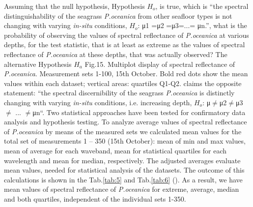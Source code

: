 \documentclass[11pt]{article}
\begin{document}
Assuming that the null hypothesis, Hypothesis $H_o$, is true, which is “the spectral distinguishability of
the seagrass \textit{P.oceanica} from other seafloor types is not changing with varying \textit{in-situ} conditions,
$H_o$: μ1 =μ2 =μ3=...= μn.”, what is the probability of observing the values of spectral reflectance of
\textit{P.oceanica} at various depths, for the test statistic, that is at least as extreme as the values of spectral
reflectance of \textit{P.oceanica} at these depths, that was actually observed? The alternative Hypothesis $H_a$
Fig.15. Multiplot display of spectral reflectance of \textit{P.oceanica}. Measurement sets 1-100, 15th
October. Bold red dots show the mean values within each dataset; vertical areas: quartiles Q1-Q2.
claims the opposite statement: “the spectral discernibility of the seagrass \textit{P.oceanica} is distinctly
changing with varying \textit{in-situ} conditions, i.e. increasing depth, $H_o$: μ$\neq$μ2$\neq$μ3$\neq$ ... $\neq$μn“.
Two statistical approaches have been tested for confirmatory data analysis and hypothesis testing.
To analyze average values of spectral reflectance of \textit{P.oceanica} by means of the measured sets we calculated 
mean values for the total set of measurements 1 – 350 (15th October): mean of min and max values, 
mean of average for each waveband, mean for statistical quartiles for each wavelength and mean for median, respectively. 
The adjusted averages evaluate mean values, needed for statistical analysis of the datasets. 
The outcome of this calculations is shown in the Tab.\ref{tab:5} and Tab.\ref{tab:6} (). 
As a result, we have mean values of spectral reflectance of \textit{P.oceanica} for extreme, average, median and both quartiles,
independent of the individual sets 1-350. 
\end{document}

